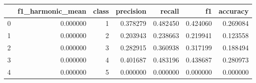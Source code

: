 \begin{tabular}{lrrrrrr}
\toprule
 & f1_harmonic_mean & class & precision & recall & f1 & accuracy \\
\midrule
0 & 0.000000 & 1 & 0.378279 & 0.482450 & 0.424060 & 0.269084 \\
1 & 0.000000 & 2 & 0.203943 & 0.238663 & 0.219941 & 0.123558 \\
2 & 0.000000 & 3 & 0.282915 & 0.360938 & 0.317199 & 0.188494 \\
3 & 0.000000 & 4 & 0.401687 & 0.483196 & 0.438687 & 0.280973 \\
4 & 0.000000 & 5 & 0.000000 & 0.000000 & 0.000000 & 0.000000 \\
\bottomrule
\end{tabular}
